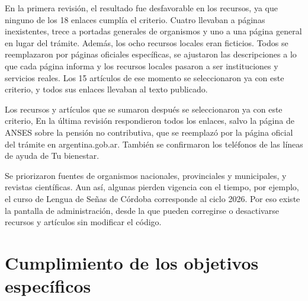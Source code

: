 En la primera revisión, el resultado fue desfavorable en los recursos, ya que ninguno de los 18 enlaces cumplía el criterio. Cuatro llevaban a páginas inexistentes, trece a portadas generales de organismos y uno a una página general en lugar del trámite. Además, los ocho recursos locales eran ficticios. Todos se reemplazaron por páginas oficiales específicas, se ajustaron las descripciones a lo que cada página informa y los recursos locales pasaron a ser instituciones y servicios reales. Los 15 artículos de ese momento se seleccionaron ya con este criterio, y todos sus enlaces llevaban al texto publicado.

Los recursos y artículos que se sumaron después se seleccionaron ya con este criterio, En la última revisión respondieron todos los enlaces, salvo la página de ANSES sobre la pensión no contributiva, que se reemplazó por la página oficial del trámite en argentina.gob.ar. También se confirmaron los teléfonos de las líneas de ayuda de Tu bienestar.

Se priorizaron fuentes de organismos nacionales, provinciales y municipales, y revistas científicas. Aun así, algunas pierden vigencia con el tiempo, por ejemplo, el curso de Lengua de Señas de Córdoba corresponde al ciclo 2026. Por eso existe la pantalla de administración, desde la que pueden corregirse o desactivarse recursos y artículos sin modificar el código.

\section{Cumplimiento de los objetivos específicos}\label{sec:objetivos-cumplidos}

